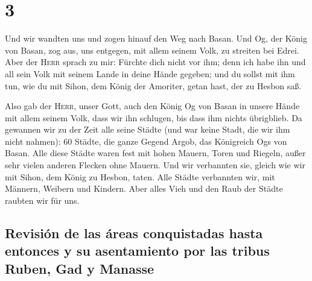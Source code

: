 \hypertarget{section-2}{%
\section{3}\label{section-2}}

 Und wir wandten uns und zogen hinauf den Weg nach Basan.
Und Og, der König von Basan, zog aus, uns entgegen, mit allem seinem
Volk, zu streiten bei Edrei.  Aber der \textsc{Herr}
sprach zu mir: Fürchte dich nicht vor ihm; denn ich habe ihn und all
sein Volk mit seinem Lande in deine Hände gegeben; und du sollst mit ihm
tun, wie du mit Sihon, dem König der Amoriter, getan hast, der zu Hesbon
saß.

 Also gab der \textsc{Herr}, unser Gott, auch den König Og
von Basan in unsere Hände mit allem seinem Volk, dass wir ihn schlugen,
bis dass ihm nichts übrigblieb.  Da gewannen wir zu der
Zeit alle seine Städte (und war keine Stadt, die wir ihm nicht nahmen):
60 Städte, die ganze Gegend Argob, das Königreich Ogs von Basan.
 Alle diese Städte waren fest mit hohen Mauern, Toren und
Riegeln, außer sehr vielen anderen Flecken ohne Mauern. 
Und wir verbannten sie, gleich wie wir mit Sihon, dem König zu Hesbon,
taten. Alle Städte verbannten wir, mit Männern, Weibern und Kindern.
 Aber alles Vieh und den Raub der Städte raubten wir für
uns.

\hypertarget{revisiuxf3n-de-las-uxe1reas-conquistadas-hasta-entonces-y-su-asentamiento-por-las-tribus-ruben-gad-y-manasse}{%
\subsection{Revisión de las áreas conquistadas hasta entonces y su
asentamiento por las tribus Ruben, Gad y
Manasse}\label{revisiuxf3n-de-las-uxe1reas-conquistadas-hasta-entonces-y-su-asentamiento-por-las-tribus-ruben-gad-y-manasse}}

